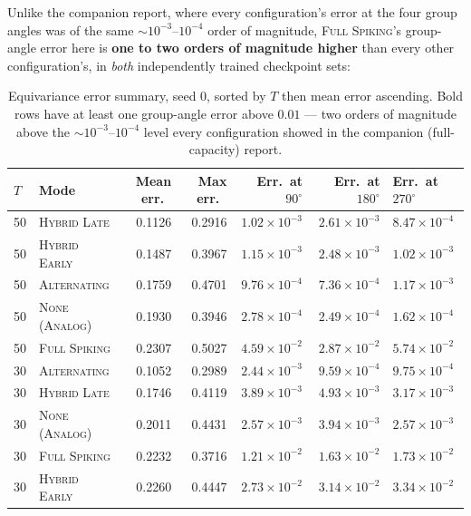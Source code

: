 \documentclass[11pt]{article}
\newcommand{\None}{\textsc{None (Analog)}}
\newcommand{\Alternating}{\textsc{Alternating}}
\newcommand{\FullSpiking}{\textsc{Full Spiking}}
\newcommand{\HybridLate}{\textsc{Hybrid Late}}
\newcommand{\HybridEarly}{\textsc{Hybrid Early}}
\begin{document}
Unlike the companion report, where every configuration's error at the four group angles was of the
same $\sim 10^{-3}$--$10^{-4}$ order of magnitude, \FullSpiking's group-angle error here is
\textbf{one to two orders of magnitude higher} than every other configuration's, in \emph{both}
independently trained checkpoint sets:

\begin{table}[H]
\centering
\small
\begin{tabular}{@{}llrrrrl@{}}
\toprule
$T$ & Mode & Mean err.\ & Max err.\ & Err.\ at $90^\circ$ & Err.\ at $180^\circ$ & Err.\ at $270^\circ$ \\
\midrule
50 & \HybridLate  & 0.1126 & 0.2916 & $1.02\times10^{-3}$ & $2.61\times10^{-3}$ & $8.47\times10^{-4}$ \\
50 & \HybridEarly & 0.1487 & 0.3967 & $1.15\times10^{-3}$ & $2.48\times10^{-3}$ & $1.02\times10^{-3}$ \\
50 & \Alternating & 0.1759 & 0.4701 & $9.76\times10^{-4}$ & $7.36\times10^{-4}$ & $1.17\times10^{-3}$ \\
50 & \None        & 0.1930 & 0.3946 & $2.78\times10^{-4}$ & $2.49\times10^{-4}$ & $1.62\times10^{-4}$ \\
50 & \FullSpiking & 0.2307 & 0.5027 & \bfseries $4.59\times10^{-2}$ & \bfseries $2.87\times10^{-2}$ & \bfseries $5.74\times10^{-2}$ \\
\midrule
30 & \Alternating & 0.1052 & 0.2989 & $2.44\times10^{-3}$ & $9.59\times10^{-4}$ & $9.75\times10^{-4}$ \\
30 & \HybridLate  & 0.1746 & 0.4119 & $3.89\times10^{-3}$ & $4.93\times10^{-3}$ & $3.17\times10^{-3}$ \\
30 & \None        & 0.2011 & 0.4431 & $2.57\times10^{-3}$ & $3.94\times10^{-3}$ & $2.57\times10^{-3}$ \\
30 & \FullSpiking & 0.2232 & 0.3716 & \bfseries $1.21\times10^{-2}$ & \bfseries $1.63\times10^{-2}$ & \bfseries $1.73\times10^{-2}$ \\
30 & \HybridEarly & 0.2260 & 0.4447 & \bfseries $2.73\times10^{-2}$ & \bfseries $3.14\times10^{-2}$ & \bfseries $3.34\times10^{-2}$ \\
\bottomrule
\end{tabular}
\caption{Equivariance error summary, seed 0, sorted by $T$ then mean error ascending. Bold rows have
at least one group-angle error above $0.01$ --- two orders of magnitude above the $\sim 10^{-3}$--$10^{-4}$
level every configuration showed in the companion (full-capacity) report.}
\label{tab:eqerr}
\end{table}
\end{document}
